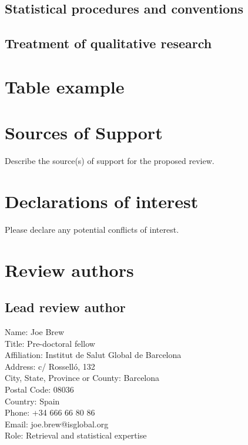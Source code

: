 \documentclass{article}
\begin{document}
\subsection*{Statistical procedures and conventions}

\subsection*{Treatment of qualitative research}



\section*{Table example}

\section*{Sources of Support}

Describe the source(s) of support for the proposed review. 

\section*{Declarations of interest}

Please declare any potential conflicts of interest.

\section*{Review authors}

\subsection*{Lead review author}

Name: Joe Brew\\
Title: Pre-doctoral fellow\\
Affiliation: Institut de Salut Global de Barcelona\\
Address: c/ Rosselló, 132\\
City, State, Province or County: Barcelona\\
Postal Code: 08036\\
Country: Spain\\
Phone: +34 666 66 80 86\\
Email: joe.brew@isglobal.org\\
Role: Retrieval and statistical expertise\\
\end{document}
